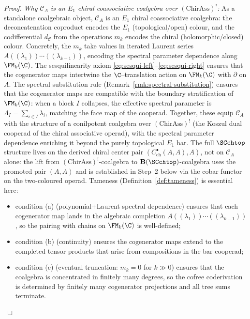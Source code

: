 \begin{proof}
\emph{Why $\mathcal{C}_A$ is an $E_1$ chiral coassociative coalgebra
over $(\mathrm{ChirAss})^!$:}
As a standalone coalgebraic object, $\mathcal{C}_A$ is an $E_1$
chiral coassociative coalgebra: the deconcatenation coproduct
encodes the $E_1$ (topological/open) colour, and the codifferential
$d_{\mathcal{C}}$ from the operations $m_k$ encodes the chiral
(holomorphic/closed) colour. Concretely, the $m_k$ take values in
iterated Laurent series
$A((\lambda_1))\cdots((\lambda_{k-1}))$, encoding the spectral
parameter dependence along $\FM_k(\C)$. The sesquilinearity axiom
\eqref{eq:sesqui-left}--\eqref{eq:sesqui-right} ensures that the
cogenerator maps intertwine the $\C$--translation action on
$\FM_k(\C)$ with $\partial$ on $A$.
The spectral substitution rule (Remark~\ref{rmk:spectral-substitution})
ensures that the cogenerator maps are compatible with the boundary
stratification of $\FM_k(\C)$: when a block $I$ collapses, the
effective spectral parameter is $\Lambda_I = \sum_{i \in I} \lambda_i$,
matching the face map of the cooperad.
Together, these equip $\mathcal{C}_A$ with the structure of a
conilpotent coalgebra over $(\mathrm{ChirAss})^!$
(the Koszul dual cooperad of the chiral associative operad),
with the spectral parameter dependence enriching it beyond the
purely topological $E_1$ bar. The full $\SCchtop$ structure lives
on the derived chiral center pair $(C^\bullet_{\mathrm{ch}}(A,A), A)$, not
on $\mathcal{C}_A$ alone: the lift from
$(\mathrm{ChirAss})^!$-coalgebra to $\mathbf B(\SCchtop)$-coalgebra
uses the promoted pair $(A,A)$ and is established in Step~2 below
via the cobar functor on the two-coloured operad.
Tameness (Definition~\ref{def:tameness}) is essential here:
\begin{itemize}
 \item condition (a) (polynomial$+$Laurent spectral dependence)
 ensures that each cogenerator map lands in the algebraic
 completion $A((\lambda_1))\cdots((\lambda_{k-1}))$, so the
 pairing with chains on $\FM_k(\C)$ is well-defined;
 \item condition (b) (continuity) ensures the cogenerator maps
 extend to the completed tensor products that arise from
 compositions in the bar cooperad;
 \item condition (c) (eventual truncation: $m_k = 0$ for $k \gg 0$)
 ensures that the coalgebra is concentrated in finitely many
 degrees, so the cofree coderivation is determined by finitely
 many cogenerator projections and all tree sums terminate.
\end{itemize}


\end{proof}
